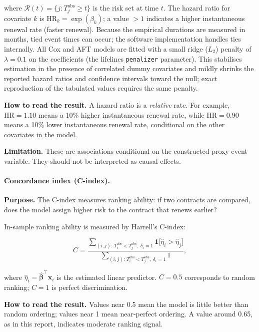 \documentclass[12pt, a4paper]{article}
\begin{document}
where $\mathcal{R}(t) = \{j : T_j^{\text{obs}} \geq t\}$ is the risk set at
time $t$. The hazard ratio for covariate $k$ is $\mathrm{HR}_k = \exp(\beta_k)$;
a value $> 1$ indicates a higher instantaneous renewal rate (faster renewal).
Because the empirical durations are measured in months, tied event times can
occur; the software implementation handles ties internally.
All Cox and AFT models are fitted with a small ridge ($L_2$) penalty of
$\lambda = 0.1$ on the coefficients (the lifelines \texttt{penalizer}
parameter). This stabilises estimation in the presence of correlated dummy
covariates and mildly shrinks the reported hazard ratios and confidence
intervals toward the null; exact reproduction of the tabulated values requires
the same penalty.

\textbf{How to read the result.} A hazard ratio is a \emph{relative} rate.
For example, $\mathrm{HR}=1.10$ means a 10\% higher instantaneous renewal rate,
while $\mathrm{HR}=0.90$ means a 10\% lower instantaneous renewal rate,
conditional on the other covariates in the model.

\textbf{Limitation.} These are associations conditional on the constructed
proxy event variable. They should not be interpreted as causal effects.

\paragraph{Concordance index (C-index).}
\textbf{Purpose.} The C-index measures ranking ability: if two contracts are
compared, does the model assign higher risk to the contract that renews
earlier?

In-sample ranking ability is measured by Harrell's C-index:

\begin{equation}
  C
  =
  \frac{
    \displaystyle\sum_{(i,j):\, T_i^{\text{obs}} < T_j^{\text{obs}},\; \delta_i = 1}
    \mathbf{1}\bigl[\hat{\eta}_i > \hat{\eta}_j\bigr]
  }{
    \displaystyle\sum_{(i,j):\, T_i^{\text{obs}} < T_j^{\text{obs}},\; \delta_i = 1}
    1
  },
\end{equation}

where $\hat{\eta}_i = \boldsymbol{\hat{\beta}}^\top \mathbf{x}_i$ is the
estimated linear predictor. $C = 0.5$ corresponds to random ranking;
$C = 1$ is perfect discrimination.

\textbf{How to read the result.} Values near 0.5 mean the model is little
better than random ordering; values near 1 mean near-perfect ordering. A value
around 0.65, as in this report, indicates moderate ranking signal.
\end{document}
